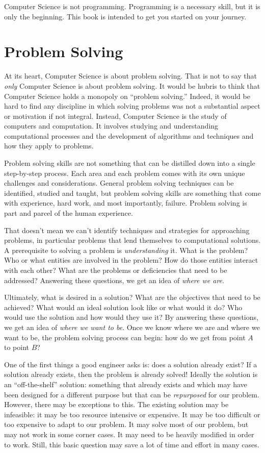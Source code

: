 Computer Science is not programming.  Programming is a necessary skill, but
it is only the beginning.  This book is intended to get you started
on your journey.

\section{Problem Solving}

At its heart, Computer Science is about problem solving.  That is not to say that \emph{only} Computer Science is about problem solving.  It would be hubris to think that Computer Science holds a monopoly on ``problem solving.''  Indeed, it would be hard to find any 
discipline in which solving problems was not a substantial aspect or 
motivation if not integral.  Instead, Computer Science is the study of
computers and computation.  It involves studying and understanding 
computational processes and the development of algorithms and techniques 
and how they apply to problems.

Problem solving skills are not something that can be distilled down into 
a single step-by-step process.  Each area and each problem comes with
its own unique challenges and considerations.  General problem solving 
techniques can be identified, studied and taught, but problem solving skills 
are something that come with experience, hard work, and most importantly, 
failure.  Problem solving is part and parcel of the human experience.  

That doesn't mean we can't identify techniques and strategies for
approaching problems, in particular problems that lend themselves to
computational solutions.  A prerequisite to solving a problem is 
\emph{understanding} it.  What is the problem?  Who or what entities
are involved in the problem?  How do those entities interact with each
other?  What are the problems or deficiencies that need to be addressed?
Answering these questions, we get an idea of \emph{where we are}.

Ultimately, what is desired in a solution?  What are the objectives that
need to be achieved?  What would an ideal solution look like or what
would it do?  Who would use the solution and how would they use it?
By answering these questions, we get an idea of \emph{where we want to be}.
Once we know where we are and where we want to be, the problem solving
process can begin: how do we get from point $A$ to point $B$?

One of the first things a good engineer asks is: does a solution already exist?
If a solution already exists, then the problem is already solved!  Ideally the
solution is an ``off-the-shelf'' solution: something that already exists 
and which may have been designed for a different purpose but that can
be \emph{repurposed} for our problem.  However, there may be exceptions
to this.  The existing solution may be infeasible: it may be too resource
intensive or expensive.  It may be too difficult or too expensive to adapt
to our problem.  It may solve most of our problem, but may not work in
some corner cases.  It may need to be heavily modified in order to
work.  Still, this basic question may save a lot of time and effort in many
cases.  

